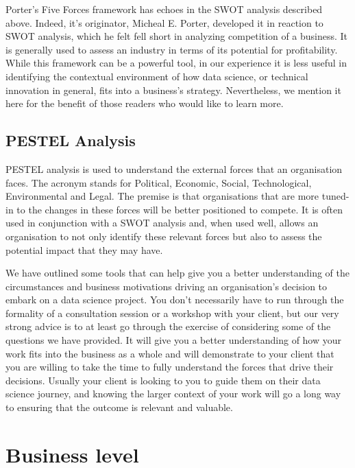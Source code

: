 \documentclass[
]{book}
\begin{document}
Porter's Five Forces framework has echoes in the SWOT analysis described
above. Indeed, it's originator, Micheal E. Porter, developed it in
reaction to SWOT analysis, which he felt fell short in analyzing
competition of a business. It is generally used to assess an industry in
terms of its potential for profitability. While this framework can be a
powerful tool, in our experience it is less useful in identifying the
contextual environment of how data science, or technical innovation in
general, fits into a business's strategy. Nevertheless, we mention it
here for the benefit of those readers who would like to learn more.

\hypertarget{pestel-analysis}{%
\subsection{PESTEL Analysis}\label{pestel-analysis}}

PESTEL analysis is used to understand the external forces that an
organisation faces. The acronym stands for Political, Economic, Social,
Technological, Environmental and Legal. The premise is that
organisations that are more tuned-in to the changes in these forces will
be better positioned to compete. It is often used in conjunction with a
SWOT analysis and, when used well, allows an organisation to not only
identify these relevant forces but also to assess the potential impact
that they may have.

We have outlined some tools that can help give you a better
understanding of the circumstances and business motivations driving an
organisation's decision to embark on a data science project. You don't
necessarily have to run through the formality of a consultation session
or a workshop with your client, but our very strong advice is to at
least go through the exercise of considering some of the questions we
have provided. It will give you a better understanding of how your work
fits into the business as a whole and will demonstrate to your client
that you are willing to take the time to fully understand the forces
that drive their decisions. Usually your client is looking to you to
guide them on their data science journey, and knowing the larger context
of your work will go a long way to ensuring that the outcome is relevant
and valuable.

\hypertarget{business-level}{%
\section{Business level}\label{business-level}}
\end{document}

